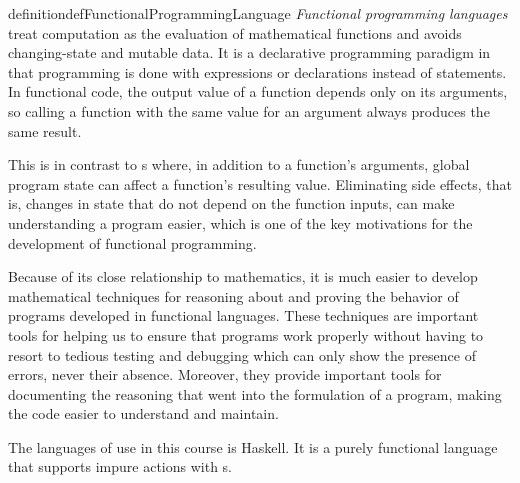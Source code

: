 \begin{restatable}{definition}{defFunctionalProgrammingLanguage}\label{def:Functional_Programming_Language}
  \emph{Functional programming languages} treat computation as the evaluation of mathematical functions and avoids changing-state and mutable data.
  It is a declarative programming paradigm in that programming is done with expressions or declarations instead of statements.
  In functional code, the output value of a function depends only on its arguments, so calling a function with the same value for an argument always produces the same result.

  This is in contrast to s where, in addition to a function's arguments, global program state can affect a function's resulting value.
  Eliminating side effects, that is, changes in state that do not depend on the function inputs, can make understanding a program easier, which is one of the key motivations for the development of functional programming.

  Because of its close relationship to mathematics, it is much easier to develop mathematical techniques for reasoning about and proving the behavior of programs developed in functional languages.
  These techniques are important tools for helping us to ensure that programs work properly without having to resort to tedious testing and debugging which can only show the presence of errors, never their absence.
  Moreover, they provide important tools for documenting the reasoning that went into the formulation of a program, making the code easier to understand and maintain.

  \begin{remark}
    The languages of use in this course is Haskell.
    It is a purely functional language that supports impure actions with s.
  \end{remark}
\end{restatable}

